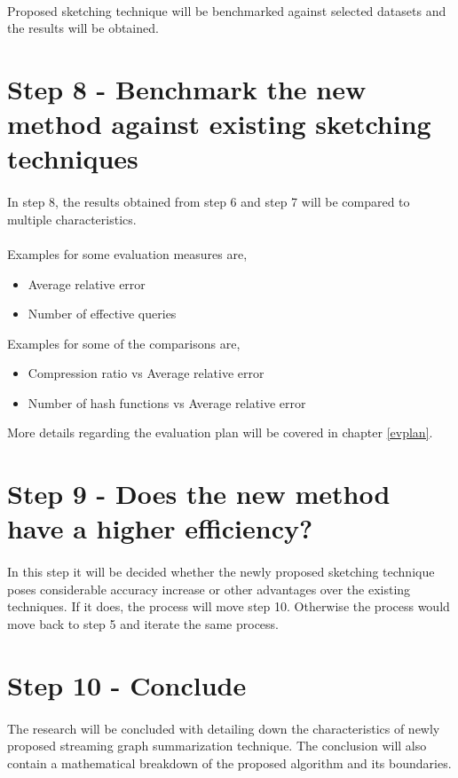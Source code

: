 \paragraph{}
Proposed sketching technique will be benchmarked against selected datasets and the results will be obtained. 

\section*{Step 8 - Benchmark the new method against existing sketching techniques}

\paragraph{}
In step 8, the results obtained from step 6 and step 7 will be compared to multiple characteristics. 

\paragraph{}
Examples for some evaluation measures are,

\begin{itemize}
    \item Average relative error\cite{kumarage_efficient_2017}
    \item Number of effective queries\cite{kumarage_efficient_2017}
\end{itemize}

Examples for some of the comparisons are,

\begin{itemize}
    \item Compression ratio vs Average relative error
    \item Number of hash functions vs Average relative error
\end{itemize}

More details regarding the evaluation plan will be covered in chapter \ref{evplan}.

\section*{Step 9 - Does the new method have a higher efficiency?}

\paragraph{}
In this step it will be decided whether the newly proposed sketching technique poses considerable accuracy increase or other advantages over the existing techniques. If it does, the process will move step 10. Otherwise the process would move back to step 5 and iterate the same process. 

\section*{Step 10 - Conclude}

\paragraph{}
The research will be concluded with detailing down the characteristics of newly proposed streaming graph summarization technique. The conclusion will also contain a mathematical breakdown of the proposed algorithm and its boundaries. 